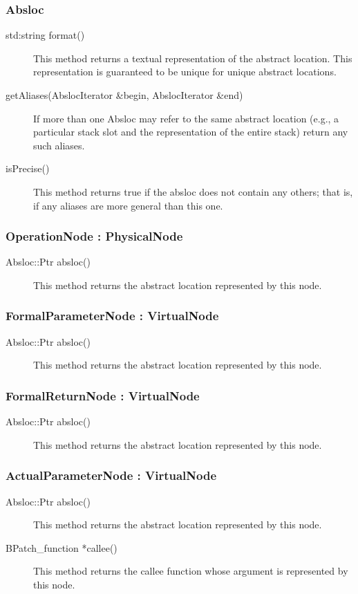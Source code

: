 \documentclass[12pt,titlepage]{article}
\begin{document}
\subsubsection{Absloc}
\begin{description}
\item[std:string format()]
This method returns a textual representation of the abstract location. This representation is guaranteed to be unique for unique abstract locations.
\item[getAliases(AbslocIterator \&begin, AbslocIterator \&end)]
If more than one Absloc may refer to the same abstract location (e.g., a particular stack slot and the representation of the entire stack) return any such aliases.
\item[isPrecise()]
This method returns true if the absloc does not contain any others; that is, if any aliases are more general than this one.
\end{description}

\subsubsection{OperationNode : PhysicalNode}
\begin{description}
\item[Absloc::Ptr absloc()]
This method returns the abstract location represented by this node.
\end{description}

\subsubsection{FormalParameterNode : VirtualNode}
\begin{description}
\item[Absloc::Ptr absloc()]
This method returns the abstract location represented by this node. 
\end{description}

\subsubsection{FormalReturnNode : VirtualNode}
\begin{description}
\item[Absloc::Ptr absloc()]
This method returns the abstract location represented by this node.
\end{description}

\subsubsection{ActualParameterNode : VirtualNode}
\begin{description}
\item[Absloc::Ptr absloc()]
This method returns the abstract location represented by this node.
\item[BPatch\_function *callee() ]
This method returns the callee function whose argument is represented by this node.
\end{description}
\end{document}
